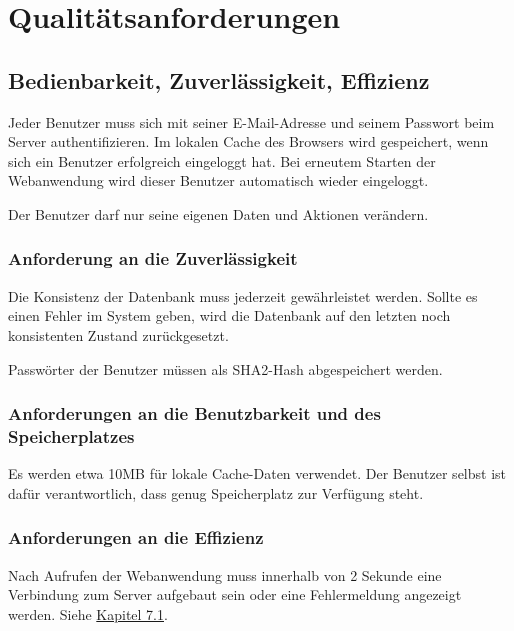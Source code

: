 \documentclass[a4paper,12pt,oneside]{scrartcl}
\begin{document}
\section{Qualitätsanforderungen}


\subsection{Bedienbarkeit, Zuverlässigkeit, Effizienz}
Jeder Benutzer muss sich mit seiner E-Mail-Adresse und seinem Passwort beim Server authentifizieren.
Im lokalen Cache des Browsers wird gespeichert, wenn sich ein Benutzer erfolgreich eingeloggt hat.
Bei erneutem Starten der Webanwendung wird dieser Benutzer automatisch wieder eingeloggt.

Der Benutzer darf nur seine eigenen Daten und Aktionen verändern.



\subsubsection{Anforderung an die Zuverlässigkeit}
Die Konsistenz der Datenbank muss jederzeit gewährleistet werden.
Sollte es einen Fehler im System geben, wird die Datenbank auf den letzten noch konsistenten Zustand zurückgesetzt.

Passwörter der Benutzer müssen als SHA2-Hash abgespeichert werden.


\subsubsection{Anforderungen an die Benutzbarkeit und des Speicherplatzes}
Es werden etwa 10MB für lokale Cache-Daten verwendet.
Der Benutzer selbst ist dafür verantwortlich, dass genug Speicherplatz zur Verfügung steht.


\subsubsection{Anforderungen an die Effizienz}
Nach Aufrufen der Webanwendung muss innerhalb von 2 Sekunde eine Verbindung zum Server aufgebaut sein oder eine Fehlermeldung angezeigt werden.
Siehe \hyperlink{s07}{Kapitel 7.1}.
\end{document}

